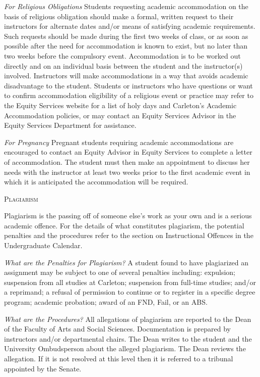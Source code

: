 \documentclass[12pt]{article}
\begin{document}
\textit{For Religious Obligations} Students requesting academic accommodation on the basis of religious obligation should make a formal, written request to their instructors for alternate dates and/or means of satisfying academic requirements. Such requests should be made during the first two weeks of class, or as soon as possible after the need for accommodation is known to exist, but no later than two weeks before the compulsory event. Accommodation is to be worked out directly and on an individual basis between the student and the instructor(s) involved. Instructors will make accommodations in a way that avoids academic disadvantage to the student. Students or instructors who have questions or want to confirm accommodation eligibility of a religious event or practice may refer to the Equity Services website for a list of holy days and Carleton's Academic Accommodation policies, or may contact an Equity Services Advisor in the Equity Services Department for assistance.

\textit{For Pregnancy} Pregnant students requiring academic accommodations are encouraged to contact an Equity Advisor in Equity Services to complete a letter of accommodation. The student must then make an appointment to discuss her needs with the instructor at least two weeks prior to the first academic event in which it is anticipated the accommodation will be required.

\vspace{.125in}

{\large \textsc{Plagiarism}}

Plagiarism is the passing off of someone else's work as your own and is a serious academic offence. For the details of what constitutes plagiarism, the potential penalties and the procedures refer to the section on Instructional Offences in the Undergraduate Calendar.

\textit{What are the Penalties for Plagiarism?} A student found to have plagiarized an assignment may be subject to one of several penalties including: expulsion; suspension from all studies at Carleton; suspension from full-time studies; and/or a reprimand; a refusal of permission to continue or to register in a specific degree program; academic probation; award of an FND, Fail, or an ABS.

\textit{What are the Procedures?} All allegations of plagiarism are reported to the Dean of the Faculty of Arts and Social Sciences. Documentation is prepared by instructors and/or departmental chairs. The Dean writes to the student and the University Ombudsperson about the alleged plagiarism. The Dean reviews the allegation. If it is not resolved at this level then it is referred to a tribunal appointed by the Senate. 
\end{document}
